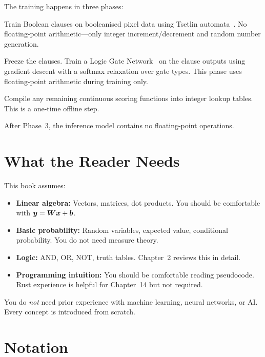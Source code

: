 The training happens in three phases:
\begin{description}[leftmargin=1em]
  \item[Phase 1 (Tsetlin):]
    Train Boolean clauses on booleanised pixel data using Tsetlin
    automata~\cite{tsetlin1961}. No floating-point arithmetic---only integer increment/decrement
    and random number generation.
  \item[Phase 2 (Logic Gates):]
    Freeze the clauses. Train a Logic Gate Network~\cite{petersen2024difflogic} on the clause outputs
    using gradient descent with a softmax relaxation over gate types.
    This phase uses floating-point arithmetic during training only.
  \item[Phase 3 (LUT Compilation):]
    Compile any remaining continuous scoring functions into integer
    lookup tables. This is a one-time offline step.
\end{description}

After Phase~3, the inference model contains no floating-point operations.


\section{What the Reader Needs}
\label{sec:prerequisites}

This book assumes:
\begin{itemize}
  \item \textbf{Linear algebra:} Vectors, matrices, dot products. You
    should be comfortable with $\bm{y} = \bm{W}\bm{x} + \bm{b}$.
  \item \textbf{Basic probability:} Random variables, expected value,
    conditional probability. You do not need measure theory.
  \item \textbf{Logic:} AND, OR, NOT, truth tables. Chapter~2 reviews
    this in detail.
  \item \textbf{Programming intuition:} You should be comfortable
    reading pseudocode. Rust experience is helpful for Chapter~14 but
    not required.
\end{itemize}

You do \emph{not} need prior experience with machine learning,
neural networks, or AI. Every concept is introduced from scratch.


\section{Notation}
\label{sec:notation}

